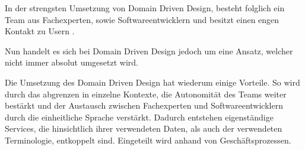 In der strengsten Umsetzung von Domain Driven Design, besteht folglich ein Team aus Fachexperten, sowie Softwareentwicklern und besitzt einen engen Kontakt zu Usern \parencites[vgl.][Kap. 4.3]{wolff_microservices_2018}.

Nun handelt es sich bei Domain Driven Design jedoch um eine Ansatz, welcher nicht immer absolut umgesetzt wird.

Die Umsetzung des Domain Driven Design hat wiederum einige Vorteile. So wird durch das abgrenzen in einzelne Kontexte, die Autonomität des Teams weiter bestärkt und der Austausch zwischen Fachexperten und Softwareentwicklern durch die einheitliche Sprache verstärkt. Dadurch entstehen eigenständige Services, die hinsichtlich ihrer verwendeten Daten, als auch der verwendeten Terminologie, entkoppelt sind. Eingeteilt wird anhand von Geschäftsprozessen.
